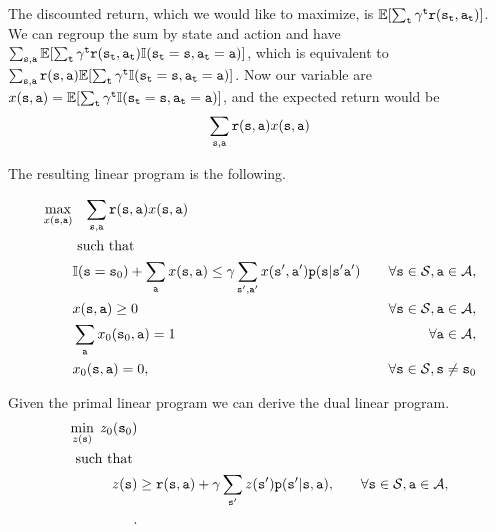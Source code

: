 \begin{leftbar}
The discounted return, which we would like to maximize, is
$\mathbb{E}[\sum_{\tt t}
\gamma^{\tt t}{\tt r}({\tt s}_{\tt t},{\tt a}_{\tt t}) ]$. We can
regroup the sum by state and action and have
$\sum_{{\tt s},{\tt a}}\mathbb{E}[\sum_{\tt t}
\gamma^{\tt t}{\tt r}({\tt s}_{\tt t},{\tt a}_{\tt t})\mathbb{I}({\tt s}_{\tt t}={\tt s},{\tt a}_{\tt t}={\tt a})]$,
which is equivalent to $\sum_{{\tt s},{\tt a}}{\tt r}({\tt s},{\tt a})
\mathbb{E}[\sum_{\tt t}
\gamma^{\tt t}\mathbb{I}({\tt s}_{\tt t}={\tt s},{\tt a}_{\tt t}={\tt a})]$.
Now our variable are $x({\tt s},{\tt a})=\mathbb{E}[\sum_{\tt t}
\gamma^{\tt t}\mathbb{I}({\tt s}_{\tt t}={\tt s},{\tt a}_{\tt t}={\tt a})]$,
and the expected return would be
\[
\sum_{{\tt s},{\tt a}} {\tt r}({\tt s},{\tt a})x({\tt s},{\tt a})
\]


The resulting linear program is the following.

\begin{align*}
\max_{x(\state,\action)}&\;\;\; \sum_{\state,\action}
\reward(\state,\action)x(\state,\action)\\
&\mbox{ such that }\\
%
&\I(\state=\state_0)+\sum_{\action} x(\state,\action)\leq \discount
\sum_{\state',\action'} x(\state',\action')\transitionprob(\state|\state'\action')
&\quad\forall \state \in {\States}, \action\in\Actions,\\
%
%
&x(\state,\action) \geq 0  &\quad\forall \state \in {\States},
\action\in\Actions,
\\
%
%
&\sum_{\action}x_{0}(\state_0,\action)=1 &\quad\forall \action\in\Actions,\\
&x_{0}(\state,\action)=0,  &\quad\forall \state \in {\States},
\state\neq \state_0\\
\end{align*}

Given the primal linear program we can derive the dual linear
program.
\begin{align*}
\min_{z(\state)}  \;z_0(\state_0)&\\
\mbox{ such that }\\
%
 z(\state) &\geq
\reward(\state,\action) + \discount
\sum_{\state'}z(\state')\transitionprob(\state'|\state,\action) , &\quad\forall
\state \in {\States},\action\in\Actions, \\ .
\end{align*}


\end{leftbar}
